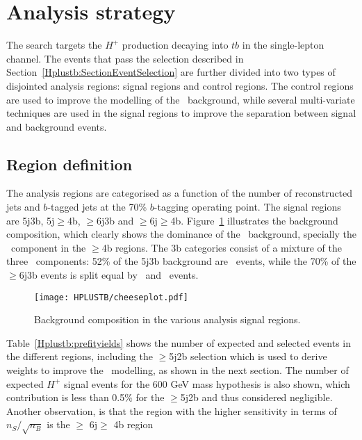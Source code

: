 \section{Analysis strategy}
The search targets the $H^+$ production decaying into $tb$ in the single-lepton channel. The events that pass the selection described in Section~\ref{Hplustb:SectionEventSelection} are further divided into two types of disjointed analysis regions: signal regions and control regions. The control regions are used to improve the modelling of the \ttjets\ background, while several multi-variate techniques are used in the signal regions to improve the separation between signal and background events.

\subsection{Region definition}

The analysis regions are categorised as a function of the number of reconstructed jets and $b$-tagged jets at the 70\% $b$-tagging operating point. The signal regions are 5j3b, 5j$\geq$4b, $\geq$6j3b and $\geq$6j$\geq$4b. Figure~\ref{Hplustb:cheeseplots} illustrates the background composition, which clearly shows the dominance of the \ttbar\ background, specially the \ttb\ component in the $\geq$4b regions. The 3b categories consist of a mixture of the three \ttbar\ components: 52\% of the 5j3b background are \ttl\ events, while the 70\% of the $\geq$6j3b events is split equal by \ttb\ and \ttl\ events.

\begin{figure}[htbp]
    \RawFloats
    \begin{center}
    \texttt{[image: HPLUSTB/cheeseplot.pdf]}
    \caption{
        Background composition in the various analysis signal regions.
    }
    \label{Hplustb:cheeseplots}
    \end{center}
\end{figure}

Table~\ref{Hplustb:prefityields} shows the number of expected and selected events in the different regions, including the $\geq$5j2b selection which is used to derive weights to improve the \ttbar\ modelling, as shown in the next section. The number of expected $H^+$ signal events for the 600 GeV mass hypothesis is also shown, which contribution is less than 0.5\% for the $\geq$5j2b and thus considered negligible. Another observation, is that the region with the higher sensitivity in terms of $n_S/\sqrt{n_B}$ is the $\geq$ 6j$\geq$ 4b region  %

